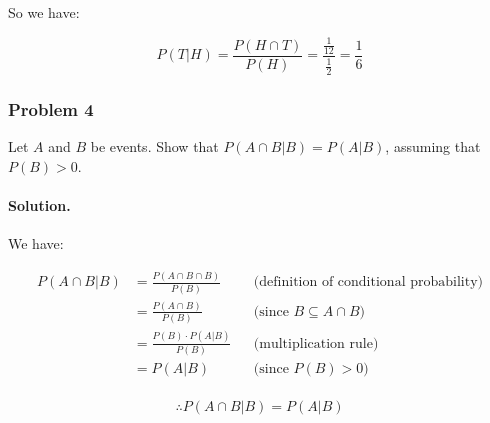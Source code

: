 So we have:

$$P(T|H) = \dfrac{P(H \cap T)}{P(H)} = \dfrac{\frac{1}{12}}{\frac{1}{2}} = \dfrac{1}{6}$$

\newpage
\subsubsection{Problem 4} Let $A$ and $B$ be events. Show that $P(A\cap B | B) = P(A | B)$, assuming that $P(B) > 0$.

\paragraph{Solution.} We have:

\begin{align*}
    P(A\cap B | B) & = \frac{P(A \cap B \cap B)}{P(B)} &  & \text{(definition of conditional probability)} \\
                   & = \frac{P(A\cap B)}{P(B)}         &  & \text{(since } B \subseteq A \cap B\text{)}    \\
                   & = \frac{P(B) \cdot P(A|B)}{P(B)}  &  & \text{(multiplication rule)}                   \\
                   & = P(A|B)                          &  & \text{(since } P(B) > 0\text{)}                \\
\end{align*}

$$\therefore P(A\cap B | B) = P(A | B)$$
